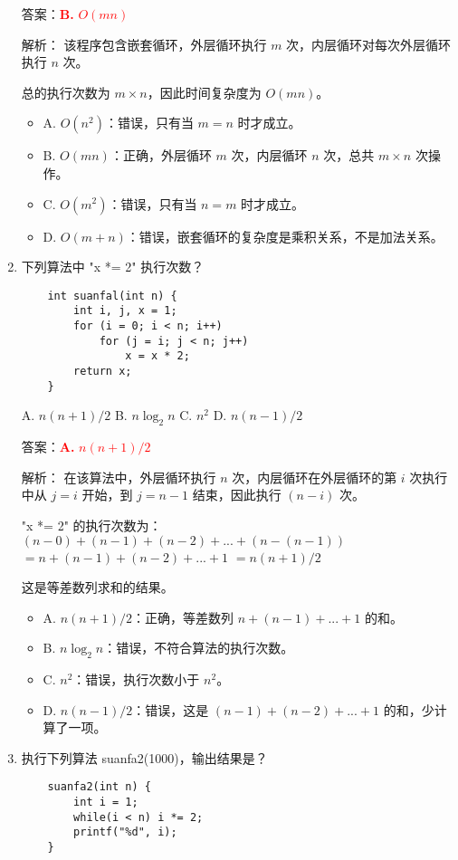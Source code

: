 \documentclass[lang=cn,newtx,10pt,scheme=chinese]{../../../elegantbook}
\begin{document}
\begin{enumerate}
    答案：\textcolor{red}{\textbf{B.} $O(mn)$}

    解析：
    该程序包含嵌套循环，外层循环执行 $m$ 次，内层循环对每次外层循环执行 $n$ 次。
    
    总的执行次数为 $m \times n$，因此时间复杂度为 $O(mn)$。

    \begin{itemize}
        \item A. $O(n^2)$：错误，只有当 $m=n$ 时才成立。
        \item B. $O(mn)$：正确，外层循环 $m$ 次，内层循环 $n$ 次，总共 $m \times n$ 次操作。
        \item C. $O(m^2)$：错误，只有当 $n=m$ 时才成立。
        \item D. $O(m+n)$：错误，嵌套循环的复杂度是乘积关系，不是加法关系。
    \end{itemize}

    \item 下列算法中 "x *= 2" 执行次数？
    \begin{verbatim}
    int suanfal(int n) {
        int i, j, x = 1;
        for (i = 0; i < n; i++)
            for (j = i; j < n; j++)
                x = x * 2;
        return x;
    }
    \end{verbatim}
    A. $n(n+1)/2$ \quad B. $n\log_2 n$ \quad C. $n^2$ \quad D. $n(n-1)/2$

    答案：\textcolor{red}{\textbf{A.} $n(n+1)/2$}

    解析：
    在该算法中，外层循环执行 $n$ 次，内层循环在外层循环的第 $i$ 次执行中从 $j=i$ 开始，到 $j=n-1$ 结束，因此执行 $(n-i)$ 次。
    
    "x *= 2" 的执行次数为：
    $(n-0) + (n-1) + (n-2) + ... + (n-(n-1))$
    $= n + (n-1) + (n-2) + ... + 1$
    $= n(n+1)/2$
    
    这是等差数列求和的结果。

    \begin{itemize}
        \item A. $n(n+1)/2$：正确，等差数列 $n + (n-1) + ... + 1$ 的和。
        \item B. $n\log_2 n$：错误，不符合算法的执行次数。
        \item C. $n^2$：错误，执行次数小于 $n^2$。
        \item D. $n(n-1)/2$：错误，这是 $(n-1) + (n-2) + ... + 1$ 的和，少计算了一项。
    \end{itemize}

    \item 执行下列算法 suanfa2(1000)，输出结果是？
    \begin{verbatim}
    suanfa2(int n) {
        int i = 1;
        while(i < n) i *= 2;
        printf("%d", i);
    }
    \end{verbatim}
    

\end{enumerate}
\end{document}
